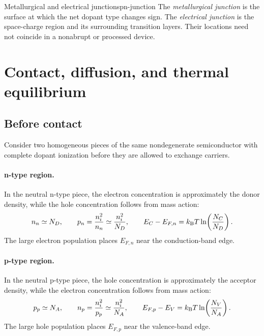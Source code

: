 \begin{definition}{Metallurgical and electrical junctions}{pn-junction}
The \emph{metallurgical junction} is the surface at which the net dopant type
changes sign.  The \emph{electrical junction} is the space-charge region and
its surrounding transition layers.  Their locations need not coincide in a
nonabrupt or processed device.
\end{definition}

\section{Contact, diffusion, and thermal equilibrium}

\subsection{Before contact}

Consider two homogeneous pieces of the same nondegenerate semiconductor with
complete dopant ionization before they are allowed to exchange carriers.

\paragraph{n-type region.}
In the neutral n-type piece, the electron concentration is approximately the
donor density, while the hole concentration follows from mass action:
\begin{equation}
 n_n\simeq N_D,
 \qquad
 p_n=\frac{n_i^2}{n_n}\simeq\frac{n_i^2}{N_D},
 \qquad
 E_C-E_{F,n}=k_{\mathrm B} T\ln\!\left(\frac{N_C}{N_D}\right).
 \label{eq:pn-isolated-n-region}
\end{equation}
The large electron population places $E_{F,n}$ near the conduction-band edge.

\paragraph{p-type region.}
In the neutral p-type piece, the hole concentration is approximately the
acceptor density, while the electron concentration follows from mass action:
\begin{equation}
 p_p\simeq N_A,
 \qquad
 n_p=\frac{n_i^2}{p_p}\simeq\frac{n_i^2}{N_A},
 \qquad
 E_{F,p}-E_V=k_{\mathrm B} T\ln\!\left(\frac{N_V}{N_A}\right).
 \label{eq:pn-isolated-p-region}
\end{equation}
The large hole population places $E_{F,p}$ near the valence-band edge.

